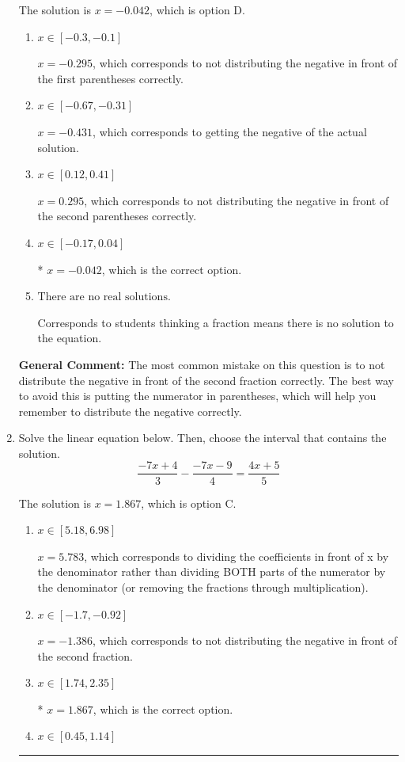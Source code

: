 \documentclass{extbook}[14pt]
\newcommand{\litem}[1]{\item #1

\rule{\textwidth}{0.4pt}}
\begin{document}
\begin{enumerate}
{The solution is \( x = -0.042 \), which is option D.\begin{enumerate}[label=\Alph*.]
\item \( x \in [-0.3, -0.1] \)

$x = -0.295$, which corresponds to not distributing the negative in front of the first parentheses correctly.
\item \( x \in [-0.67, -0.31] \)

$x = -0.431$, which corresponds to getting the negative of the actual solution.
\item \( x \in [0.12, 0.41] \)

$x = 0.295$, which corresponds to not distributing the negative in front of the second parentheses correctly.
\item \( x \in [-0.17, 0.04] \)

* $x = -0.042$, which is the correct option.
\item \( \text{There are no real solutions.} \)

Corresponds to students thinking a fraction means there is no solution to the equation.
\end{enumerate}

\textbf{General Comment:} The most common mistake on this question is to not distribute the negative in front of the second fraction correctly. The best way to avoid this is putting the numerator in parentheses, which will help you remember to distribute the negative correctly.
}
\litem{
Solve the linear equation below. Then, choose the interval that contains the solution.
\[ \frac{-7x + 4}{3} - \frac{-7x -9}{4} = \frac{4x + 5}{5} \]

The solution is \( x = 1.867 \), which is option C.\begin{enumerate}[label=\Alph*.]
\item \( x \in [5.18, 6.98] \)

 $x = 5.783$, which corresponds to dividing the coefficients in front of x by the denominator rather than dividing BOTH parts of the numerator by the denominator (or removing the fractions through multiplication).
\item \( x \in [-1.7, -0.92] \)

 $x = -1.386$, which corresponds to not distributing the negative in front of the second fraction.
\item \( x \in [1.74, 2.35] \)

* $x = 1.867$, which is the correct option.
\item \( x \in [0.45, 1.14] \)


\end{enumerate}}
\end{enumerate}
\end{document}
